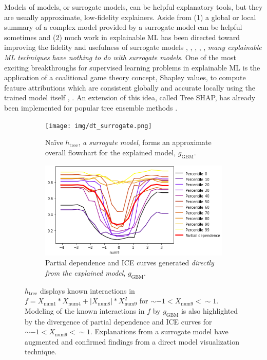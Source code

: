 \documentclass{article}
\begin{document}
Models of models, or surrogate models, can be helpful explanatory tools, but they are usually approximate, low-fidelity explainers. Aside from (1) a global or local summary of a complex model provided by a surrogate model can be helpful sometimes and (2) much work in explainable ML has been directed toward improving the fidelity and usefulness of surrogate models \cite{dt_surrogate2}, \cite{viper}, \cite{dt_surrogate1}, \cite{lime-sup}, \cite{wf_xnn}, \textit{many explainable ML techniques have nothing to do with surrogate models}. One of the most exciting breakthroughs for supervised learning problems in explainable ML is the application of a coalitional game theory concept, Shapley values, to compute feature attributions which are consistent globally and accurate locally using the trained model itself \cite{shapley}, \cite{kononenko2010efficient}. An extension of this idea, called Tree SHAP, has already been implemented for popular tree ensemble methods \cite{tree_shap}.

\begin{figure}[htb!]
	\begin{subfigure}{.55\textwidth}
		\texttt{[image: img/dt\_surrogate.png]}
  		\caption{Na\"ive $h_{\text{tree}}$, \textit{a surrogate model}, forms an approximate overall flowchart for the explained model, $g_{\text{GBM}}$.}
  		\label{fig:dt_surrogate}
	\end{subfigure}\hspace{5pt}
	\begin{subfigure}{.45\textwidth}
  		\includegraphics[height=.52\linewidth, width=1.02\linewidth]{img/pdp_ice.png}
  		\caption{Partial dependence and ICE curves generated \textit{directly from the explained model}, $g_{\text{GBM}}$.}
  		\label{fig:pdp_ice}
	\end{subfigure}
	\caption{$h_{\text{tree}}$ displays known interactions in $f = X_{\text{num}1} * X_{\text{num}4} + |X_{\text{num}8}| * X_{\text{num}9}^2$ for $\sim -1 < X_{\text{num9}} <  \sim 1$. Modeling of the known interactions in $f$ by $g_{\text{GBM}}$ is also highlighted by the divergence of partial dependence and ICE curves for $\sim -1 < X_{\text{num9}} <  \sim 1$. Explanations from a surrogate model have augmented and confirmed findings from a direct model visualization technique.}
	\label{fig:pdp_ice_dt_surrogate}
\end{figure}
\end{document}

